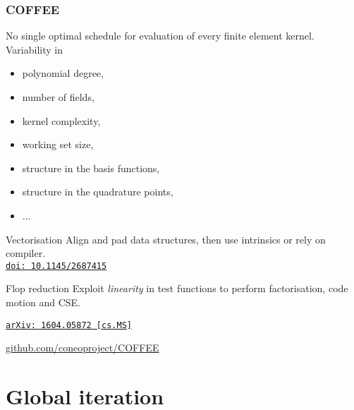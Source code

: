 \documentclass[presentation]{beamer}
\newcommand{\arxivlink}[2]{%
  \href{http://www.arxiv.org/abs/#1}%
  {{\small\texttt{arXiv:\,#1\,[#2]}}}%
}
\newcommand{\doilink}[1]{%
  \href{http://dx.doi.org/#1}%
  {{\small\texttt{doi:\,#1}{}}}%
}
\begin{document}
\begin{frame}[allowframebreaks]
  \frametitle{COFFEE}

  No single optimal schedule for evaluation of every finite element
  kernel.  Variability in
  \begin{itemize}
  \item polynomial degree,
  \item number of fields,
  \item kernel complexity,
  \item working set size,
  \item structure in the basis functions,
  \item structure in the quadrature points,
  \item ...
  \end{itemize}

\pagebreak

\begin{block}{Vectorisation}
  Align and pad data structures, then use intrinsics or rely on
  compiler.\\
  \cite{Luporini:2015} \doilink{10.1145/2687415}
\end{block}

\begin{block}{Flop reduction}
  Exploit \emph{linearity} in test functions to perform factorisation,
  code motion and CSE.  

  \cite{Luporini:2016} \arxivlink{1604.05872}{cs.MS}
\end{block}

\begin{center}
  \url{github.com/coneoproject/COFFEE}
\end{center}
\end{frame}

\section{Global iteration}
\end{document}
